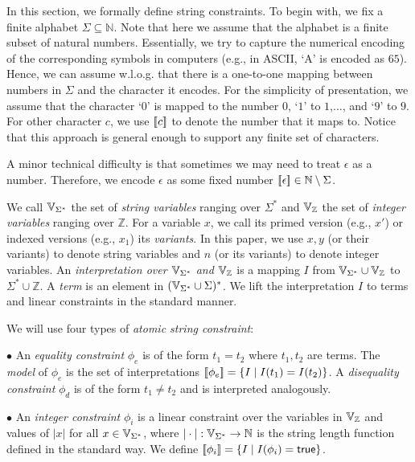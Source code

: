 \documentclass[sigplan,review,anonymous]{acmart}\settopmatter{printfolios=true,printccs=false,printacmref=false}
\begin{document}
In this section, we formally define string constraints. To begin with, we fix a finite alphabet $\Sigma \subseteq \mathbb{N}$. Note that here we assume that the alphabet is a finite subset of natural numbers. Essentially, we try to capture the numerical encoding of the corresponding symbols in computers (e.g., in ASCII, `A' is encoded as $65$). Hence, we can  assume w.l.o.g. that  there is a one-to-one mapping between numbers in $\Sigma$ and the character it encodes. For the simplicity of presentation, we assume that the character `$0$' is mapped to the number $0$, `$1$' to $1$,$\ldots$, and `$9$' to $9$. For other character $c$, we use $[\![c]\!]$ to denote the number that it maps to. Notice that this approach is general enough to support any finite set of characters. 


A minor technical difficulty is that sometimes  we may need to treat  $\epsilon$ as a  number. Therefore, we encode $\epsilon$ as some fixed number $[\![\epsilon]\!]\in\mathbb{N}\setminus\Sigma$.

We call $\mbox{$\mathbb{V}_{\Sigma^*}$}$ the set of \emph{string variables} ranging over $\Sigma^*$ and $\mbox{$\mathbb{V}_{\mathbb{Z}}$}$ the set of \emph{integer variables} ranging over $\mathbb{Z}$.
For a variable $x$, we call its primed version (e.g., $x'$) or indexed versions (e.g., $x_1$) its \emph{variants}.
In this paper, we use $x,y$ (or their variants) to denote string variables and $n$ (or its variants) to denote integer variables. An \emph{interpretation over $\mbox{$\mathbb{V}_{\Sigma^*}$}$ and $\mbox{$\mathbb{V}_{\mathbb{Z}}$}$} is a mapping $I$ from $\mbox{$\mathbb{V}_{\Sigma^*}$}\cup \mbox{$\mathbb{V}_{\mathbb{Z}}$}$ to $\Sigma^* \cup \mathbb{Z}$. A \emph{term} is an element in $(\mbox{$\mathbb{V}_{\Sigma^*}$}\cup \Sigma)^*$. We lift the interpretation $I$ to terms and linear constraints in the standard manner. 

We will use four types of \emph{atomic string constraint}: 
\smallskip


$\bullet$ An \emph{equality constraint} $\phi_e$ is of the form $t_1 = t_2$ where $t_1, 
t_2$ are terms. The \emph{model} of $\phi_e$ is the set of interpretations $[\![\phi_e]\!]=\{I\mid 
I(t_1)=I(t_2)\}$. A \emph{disequality constraint} $\phi_d$ is of the form $t_1 \neq 
t_2$ and is interpreted analogously.

\smallskip
$\bullet$ An \emph{integer constraint} $\phi_i$ is a linear constraint over the variables in $\mbox{$\mathbb{V}_{\mathbb{Z}}$}$ and values of $|x|$ for all $x \in \mbox{$\mathbb{V}_{\Sigma^*}$}$, where $|\cdot|:\mbox{$\mathbb{V}_{\Sigma^*}$} \rightarrow \mathbb{N}$ is the string length function defined in the standard way.
We define $[\![\phi_i]\!]= \{I \mid I(\phi_i)= \mbox{$\mathsf{true}$} \}$. 
\smallskip
\end{document}
